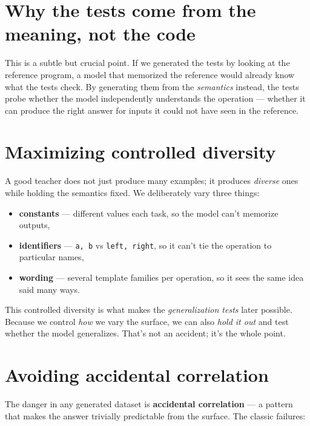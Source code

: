 \section{Why the tests come from the meaning, not the
code}\label{why-the-tests-come-from-the-meaning-not-the-code}

This is a subtle but crucial point. If we generated the tests by looking
at the reference program, a model that memorized the reference would
already know what the tests check. By generating them from the
\emph{semantics} instead, the tests probe whether the model
independently understands the operation --- whether it can produce the
right answer for inputs it could not have seen in the reference.

\section{Maximizing controlled
diversity}\label{maximizing-controlled-diversity}

A good teacher does not just produce many examples; it produces
\emph{diverse} ones while holding the semantics fixed. We deliberately
vary three things:

\begin{itemize}
\tightlist
\item
  \textbf{constants} --- different values each task, so the model can't
  memorize outputs,
\item
  \textbf{identifiers} --- \texttt{a,\ b} vs \texttt{left,\ right}, so
  it can't tie the operation to particular names,
\item
  \textbf{wording} --- several template families per operation, so it
  sees the same idea said many ways.
\end{itemize}

This controlled diversity is what makes the \emph{generalization tests}
later possible. Because we control \emph{how} we vary the surface, we
can also \emph{hold it out} and test whether the model generalizes.
That's not an accident; it's the whole point.

\section{Avoiding accidental
correlation}\label{avoiding-accidental-correlation}

The danger in any generated dataset is \textbf{accidental correlation}
--- a pattern that makes the answer trivially predictable from the
surface. The classic failures:

